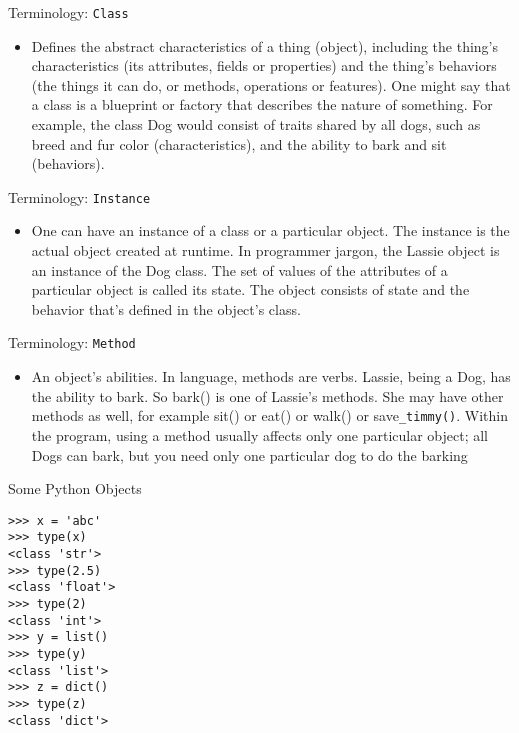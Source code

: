 \documentclass[serif, aspectratio=169]{beamer}
\begin{document}
\begin{frame}{Terminology: \texttt{\color{red}Class}}
	\begin{itemize}
		\item Defines the abstract characteristics of a thing (object), including the thing's characteristics (its attributes, fields or properties) and the thing's behaviors (the things it can do, or methods, operations or features). One might say that a class is a blueprint or factory that describes the nature of something. For example, the class Dog would consist of traits shared by all dogs, such as breed and fur color (characteristics), and the ability to bark and sit (behaviors).
	\end{itemize}
\end{frame}

\begin{frame}{Terminology: \texttt{\color{red}Instance}}
	\begin{itemize}
		\item One can have an instance of a class or a particular object. The instance is the actual object created at runtime. In programmer jargon, the Lassie object is an instance of the Dog class. The set of values of the attributes of a particular object is called its state. The object consists of state and the behavior that's defined in the object's class.
	\end{itemize}
\end{frame}

\begin{frame}{Terminology: \texttt{\color{red}Method}}
	\begin{itemize}
		\item An object's abilities. In language, methods are verbs. Lassie, being a Dog, has the ability to bark. So bark() is one of Lassie's methods. She may have other methods as well, for example sit() or eat() or walk() or save\texttt{\color{red}\_timmy()}. Within the program, using a method usually affects only one particular object; all Dogs can bark, but you need only one particular dog to do the barking
	\end{itemize}
\end{frame}

\begin{frame}[fragile]{Some Python Objects}
    \begin{lstlisting}
>>> x = 'abc'
>>> type(x)
<class 'str'>
>>> type(2.5)
<class 'float'>
>>> type(2)
<class 'int'>
>>> y = list()
>>> type(y)
<class 'list'>
>>> z = dict()
>>> type(z)
<class 'dict'>
   \end{lstlisting}
\end{frame}
\end{document}

